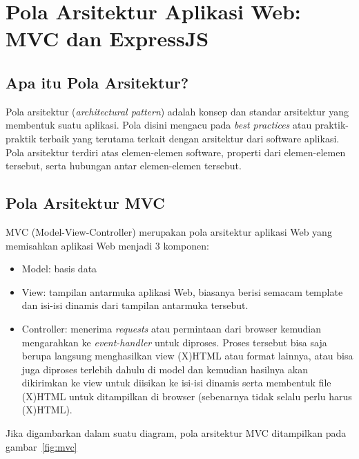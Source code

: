 \chapter{Pola Arsitektur Aplikasi Web: MVC dan ExpressJS}

\section{Apa itu Pola Arsitektur?}

Pola arsitektur (\textit{architectural pattern}) adalah konsep dan standar arsitektur yang membentuk suatu aplikasi. Pola disini mengacu pada \textit{best practices} atau praktik-praktik terbaik yang terutama terkait dengan arsitektur dari software aplikasi. Pola arsitektur terdiri atas elemen-elemen software, properti dari elemen-elemen tersebut, serta hubungan antar elemen-elemen tersebut.

\section{Pola Arsitektur MVC}

MVC (Model-View-Controller) merupakan pola arsitektur aplikasi Web yang memisahkan aplikasi Web menjadi 3 komponen:
\begin{itemize}
	\item Model: basis data
	\item View: tampilan antarmuka aplikasi Web, biasanya berisi semacam template dan isi-isi dinamis dari tampilan antarmuka tersebut.
	\item Controller: menerima \textit{requests} atau permintaan dari browser kemudian mengarahkan ke \textit{event-handler} untuk diproses. Proses tersebut bisa saja berupa langsung menghasilkan view (X)HTML atau format lainnya, atau bisa juga diproses terlebih dahulu di model dan kemudian hasilnya akan dikirimkan ke view untuk diisikan ke isi-isi dinamis serta membentuk file (X)HTML untuk ditampilkan di browser (sebenarnya tidak selalu perlu harus (X)HTML).
\end{itemize}

Jika digambarkan dalam suatu diagram, pola arsitektur MVC ditampilkan pada gambar~\ref{fig:mvc}

